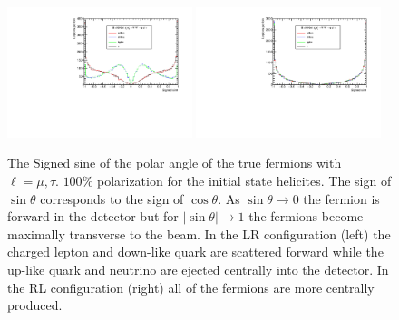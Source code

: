 \begin{figure}


\includegraphics[width=0.48\textwidth]{hsLR.pdf}
\includegraphics[width=0.48\textwidth]{hsRL.pdf}
\caption{The Signed sine of the polar angle of the true fermions with $\ell = \mu,\tau$. $100\%$ polarization for the initial state helicites. The sign of $\sin\theta$ corresponds to the sign of $\cos\theta$. As $\sin\theta \rightarrow 0$ the fermion is forward in the detector but for $|\sin\theta| \rightarrow 1$ the fermions become maximally transverse to the beam. In the LR configuration (left) the charged lepton and down-like quark are scattered forward while the up-like quark and neutrino are ejected centrally into the detector. In the RL configuration (right) all of the fermions are more centrally produced. }
\label{fig:fangles}
\end{figure}

